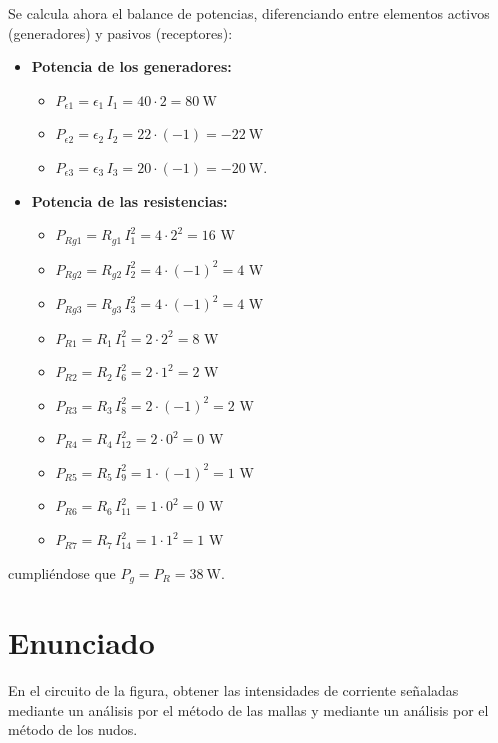      Se calcula ahora el balance de potencias, diferenciando entre
     elementos activos (generadores) y pasivos (receptores):
     \begin{itemize}
     \item \textbf{Potencia de los generadores:}
       \begin{itemize}
       \item $P_{\epsilon1}=\epsilon_1\,I_1=40\cdot 2=\qty{80}{\watt}$
       \item $P_{\epsilon2}=\epsilon_2\,I_2=22\cdot (-1)= \qty{-22}{\watt}$
       \item $P_{\epsilon3}=\epsilon_3\,I_3=20\cdot (-1)= \qty{-20}{\watt}$.
       \end{itemize}
     \item \textbf{Potencia de las resistencias:}
       \begin{itemize}
       \item $P_{Rg1}=R_{g1}\,I_1^2=4\cdot 2^2=16$ W
       \item $P_{Rg2}=R_{g2}\,I_2^2=4\cdot (-1)^2=4$ W
       \item $P_{Rg3}=R_{g3}\,I_3^2=4\cdot (-1)^2=4$ W
       \item $P_{R1}=R_1\,I_1^2=2\cdot 2^2=8$ W
       \item $P_{R2}=R_2\,I_6^2=2\cdot 1^2=2$ W
       \item $P_{R3}=R_3\,I_8^2=2\cdot (-1)^2=2$ W
       \item $P_{R4}=R_4\,I_{12}^2=2\cdot 0^2=0$ W
       \item $P_{R5}=R_5\,I_9^2=1\cdot (-1)^2=1$ W
       \item $P_{R6}=R_6\,I_{11}^2=1\cdot 0^2=0$ W
       \item $P_{R7}=R_7\,I_{14}^2=1\cdot 1^2=1$ W
       \end{itemize}
     \end{itemize}
     cumpliéndose que $P_g = P_R = \qty{38}{\watt}$.

     \section{Enunciado}
     En el circuito de la figura, obtener las intensidades de
     corriente señaladas mediante un análisis por el método de las
     mallas y mediante un análisis por el método de los nudos.

